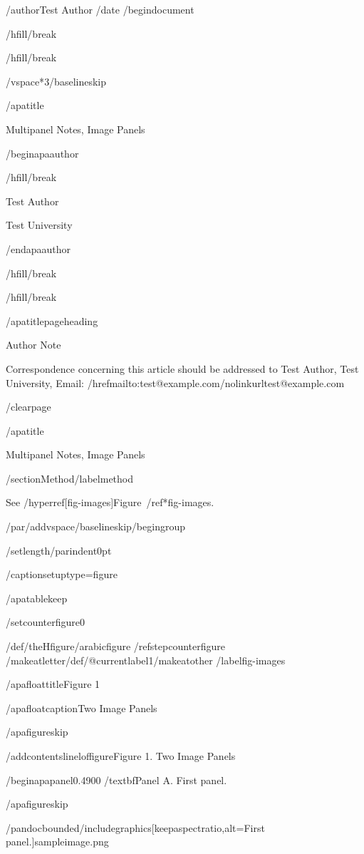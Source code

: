 /author{Test Author}
/date{}
/begin{document}


/hfill/break

/hfill/break

/vspace*{3/baselineskip}

/apatitle{

Multipanel Notes, Image Panels

}

/begin{apaauthor}

/hfill/break

Test Author

Test University

/end{apaauthor}

/hfill/break

/hfill/break

/apatitlepageheading{

Author Note

}

Correspondence concerning this article should be addressed to Test
Author, Test University, Email:
/href{mailto:test@example.com}{/nolinkurl{test@example.com}}

/clearpage

/apatitle{

Multipanel Notes, Image Panels

}

/section{Method}/label{method}

See /hyperref[fig-images]{Figure~/ref*{fig-images}}.

/par/addvspace{/baselineskip}/begingroup

/setlength{/parindent}{0pt}

/captionsetup{type=figure}

/apatablekeep

/setcounter{figure}{0}

/def/theHfigure{/arabic{figure}}%
/refstepcounter{figure}%
/makeatletter/def/@currentlabel{1}/makeatother%
/label{fig-images}

/apafloattitle{Figure 1}

/apafloatcaption{Two Image Panels}

/apafigureskip

/addcontentsline{lof}{figure}{Figure 1. Two Image Panels}

/begin{apapanel}{0.4900}%
/textbf{Panel A}. First panel.

/apafigureskip

/pandocbounded{/includegraphics[keepaspectratio,alt={First panel.}]{sampleimage.png}}

